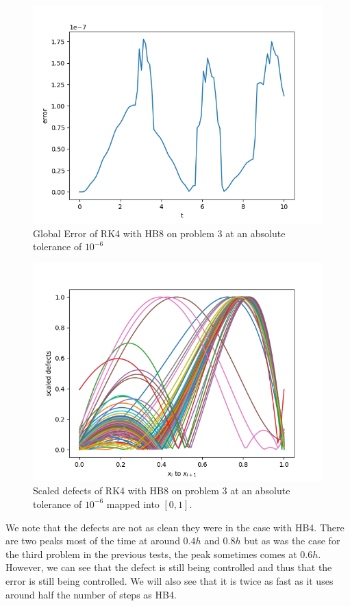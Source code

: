 \documentclass{article}
\begin{document}
\begin{figure}[H]
\centering
\includegraphics[width=0.7\linewidth]{./figures/rk4_with_hb8_p3_global_error}
\caption{Global Error of RK4 with HB8 on problem 3 at an absolute tolerance of $10^{-6}$}
\label{fig:rk4_with_hb8_p3_global_error}
\end{figure}

\begin{figure}[H]
\centering
\includegraphics[width=0.7\linewidth]{./figures/rk4_with_hb8_p3_scaled_defects}
\caption{Scaled defects of RK4 with HB8 on problem 3 at an absolute tolerance of $10^{-6}$ mapped into $[0, 1]$.}
\label{fig:rk4_with_hb8_p3_scaled_defects}
\end{figure}

We note that the defects are not as clean they were in the case with HB4. There are two peaks most of the time at around $0.4h$ and $0.8h$ but as was the case for the third problem in the previous tests, the peak sometimes comes at $0.6h$. However, we can see that the defect is still being controlled and thus that the error is still being controlled. We will also see that it is twice as fast as it uses around half the number of steps as HB4.
\end{document}
